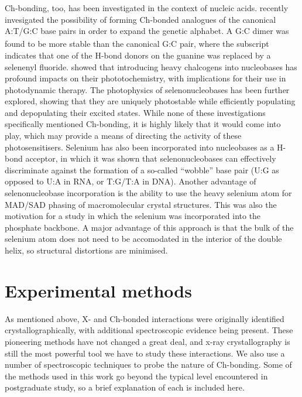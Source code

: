 \begin{refsection}
Ch-bonding, too, has been investigated in the context of nucleic acids.
 recently invesigated the possibility of forming Ch-bonded analogues of the canonical A:T/G:C base pairs in order to expand the genetic alphabet.\autocite{Sharma2020}
A G\textsubscript{}:C dimer was found to be more stable than the canonical G:C pair, where the  subscript indicates that one of the H-bond donors on the guanine was replaced by a selenenyl fluoride.
 showed that introducing heavy chalcogens into nucleobases has profound impacts on their phototochemistry, with implications for their use in photodynamic therapy.\autocite{Farrell2018}
The photophysics of selenonucleobases has been further explored, showing that they are uniquely photostable while efficiently populating and depopulating their excited states.\autocite{Mai2019,Peng2020,Fang2019,Uleany2020}
While none of these investigations specifically mentioned Ch-bonding, it is highly likely that it would come into play, which may provide a means of directing the activity of these photosensitisers.
Selenium has also been incorporated into nucleobases as a H-bond acceptor, in which it was shown that selenonucleobases can effectively discriminate against the formation of a so-called ``wobble'' base pair (U:G as opposed to U:A in RNA, or T:G/T:A in DNA).\autocite{Hassan2010,Sun2012}
Another advantage of selenonucleobase incorporation is the ability to use the heavy selenium atom for MAD/SAD phasing of macromolecular crystal structures.\autocite{Salon2007}
This was also the motivation for a \citeyear{Conlon2019} study in which the selenium was incorporated into the phosphate backbone.\autocite{Conlon2019}
A major advantage of this approach is that the bulk of the selenium atom does not need to be accomodated in the interior of the double helix, so structural distortions are minimised.

\section{Experimental methods}
As mentioned above, X- and Ch-bonded interactions were originally identified crystallographically, with additional spectroscopic evidence being present.
These pioneering methods have not changed a great deal, and x-ray crystallography is still the most powerful tool we have to study these interactions.
We also use a number of spectroscopic techniques to probe the nature of Ch-bonding.
Some of the methods used in this work go beyond the typical level encountered in postgraduate study, so a brief explanation of each is included here.


\end{refsection}
